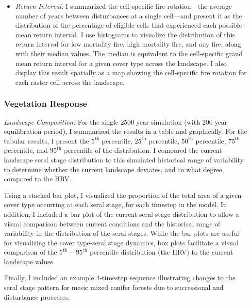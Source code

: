 \begin{itemize}
	\item \emph{Return Interval:} I summarized the cell-specific fire rotation---the average number of years between disturbances at a single cell---and present it as the distribution of the percentage of eligible cells that experienced each possible mean return interval. I use histograms to visualize the distribution of this return interval for low mortality fire, high mortality fire, and any fire, along with their median values. The median is equivalent to the cell-specific grand mean return interval for a given cover type across the landscape. I also display this result spatially as a map showing the cell-specific fire rotation for each raster cell across the landscape. 
\end{itemize}

\subsubsection*{Vegetation Response} 

\emph{Landscape Composition:} For the single 2500 year simulation (with 200 year equilibration period), I summarized the results in a table and graphically. For the tabular results, I present the $5^{\text{th}}$ percentile, $25^{\text{th}}$ percentile, $50^{\text{th}}$ percentile, $75^{\text{th}}$ percentile, and $95^{\text{th}}$ percentile of the distribution. I compared the current landscape seral stage distribution to this simulated historical range of variability to determine whether the current landscape deviates, and to what degree, compared to the HRV. 

Using a stacked bar plot, I visualized the proportion of the total area of a given cover type occurring at each seral stage, for each timestep in the model. In addition, I included a bar plot of the current seral stage distribution to allow a visual comparison between current conditions and the historical range of variability in the distribution of the seral stages. While the bar plots are useful for visualizing the cover type-seral stage dynamics, box plots facilitate a visual comparison of the $5^{\text{th}}-95^{\text{th}}$ percentile distribution (the HRV) to the current landscape values.

Finally, I included an example 4-timestep sequence illustrating changes to the seral stage pattern for mesic mixed conifer forests due to successional and disturbance procceses.

